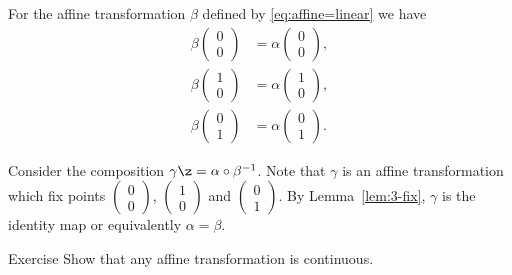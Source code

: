 For the affine transformation $\beta$ defined by \ref{eq:affine=linear}
we have 
\begin{align*}
\beta\left(\begin{smallmatrix}
0\\ 0
\end{smallmatrix} \right)
&=
\alpha\left(\begin{smallmatrix}
0\\ 0
\end{smallmatrix} \right),
\\
\beta\left(\begin{smallmatrix}
1\\ 0
\end{smallmatrix} \right)
&=
\alpha\left(\begin{smallmatrix}
1\\ 0
\end{smallmatrix} \right),
\\
\beta\left(\begin{smallmatrix}
0\\ 1
\end{smallmatrix} \right)
&=
\alpha\left(\begin{smallmatrix}
0\\ 1
\end{smallmatrix} \right).
\end{align*}

Consider the composition $\gamma\z=\alpha\circ \beta^{-1}$.
Note that $\gamma$ is an affine transformation which fix points $\left(\begin{smallmatrix}
0\\ 0
\end{smallmatrix} \right)$, 
$\left(\begin{smallmatrix}
1\\ 0
\end{smallmatrix} \right)$ 
and $\left(\begin{smallmatrix}
0\\ 1
\end{smallmatrix} \right)$.
By Lemma~\ref{lem:3-fix}, $\gamma$ is the identity map or equivalently $\alpha=\beta$.
\qeds

\begin{thm}{Exercise}
Show that any affine transformation is continuous. %
\end{thm}






















